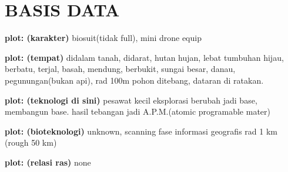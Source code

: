 \chapter{BASIS DATA}

\textbf{plot: (karakter)} biosuit(tidak full), mini drone equip

\textbf{plot: (tempat)} didalam tanah, didarat, hutan hujan, lebat tumbuhan hijau, berbatu, terjal, basah, mendung, berbukit, sungai besar, danau, pegunungan(bukan api), rad 100m pohon ditebang, dataran di ratakan.

\textbf{plot: (teknologi di sini)} pesawat kecil eksplorasi berubah jadi base, membangun base. hasil tebangan jadi A.P.M.(atomic programable mater)

\textbf{plot: (bioteknologi)} unknown, scanning fase informasi geografis rad 1 km (rough 50 km)

\textbf{plot: (relasi ras)} none

